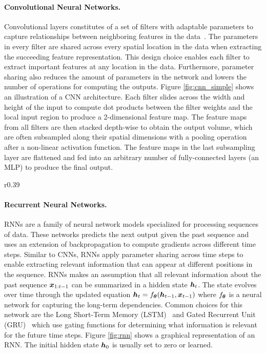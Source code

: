 \paragraph{Convolutional Neural Networks.} Convolutional layers constitutes of a set of filters with adaptable parameters to capture relationships between neighboring features in the data~\cite{lecun1998gradient}. The parameters in every filter are shared across every spatial location in the data when extracting the succeeding feature representation. This design choice enables each filter to extract important features at any location in the data. Furthermore, parameter sharing also reduces the amount of parameters in the network and lowers the number of operations for computing the outputs. Figure \ref{fig:cnn_simple} shows an illustration of a CNN architecture. Each filter slides across the width and height of the input to compute dot products between the filter weights and the local input region to produce a 2-dimensional feature map. The feature maps from all filters are then stacked depth-wise to obtain the output volume, which are often subsampled along their spatial dimensions with a pooling operation after a non-linear activation function. The feature maps in the last subsampling layer are flattened and fed into an arbitrary number of fully-connected layers (an MLP) to produce the final output. 


\vspace{-3mm}
\begin{wrapfigure}{r}{0.39\textwidth}
	\centering
	\vspace{-3mm}
	\resizebox{0.39\textwidth}{!}{
		
	}
	\captionsetup{width=.9\linewidth}
	\caption{Graphical representation of RNN.}
	\vspace{-3mm}
	\label{fig:rnn}
\end{wrapfigure}
\paragraph{Recurrent Neural Networks.} RNNs are a family of neural network models specialized for processing sequences of data. These networks predicts the next output given the past sequence and uses an extension of backpropagation to compute gradients across different time steps. 
Similar to CNNs, RNNs apply parameter sharing across time steps to enable extracting relevant information that can appear at different positions in the sequence. RNNs makes an assumption that all relevant information about the past sequence ${\bm{x}}_{1:t-1}$ can be summarized in a hidden state ${\bm{h}}_t$. The state evolves over time through the updated equation ${\bm{h}}_t = f_{{\bm{\theta}}}({\bm{h}}_{t-1}, {\bm{x}}_{t-1})$ where $f_{{\bm{\theta}}}$ is a neural network for capturing the long-term dependencies. Common choices for this network are the Long Short-Term Memory (LSTM)~\cite{hochreiter1997long} and Gated Recurrent Unit (GRU)~\cite{chung2014empirical} which use gating functions for determining what information is relevant for the future time steps. Figure \ref{fig:rnn} shows a graphical representation of an RNN. The initial hidden state ${\bm{h}}_0$ is usually set to zero or learned. 

